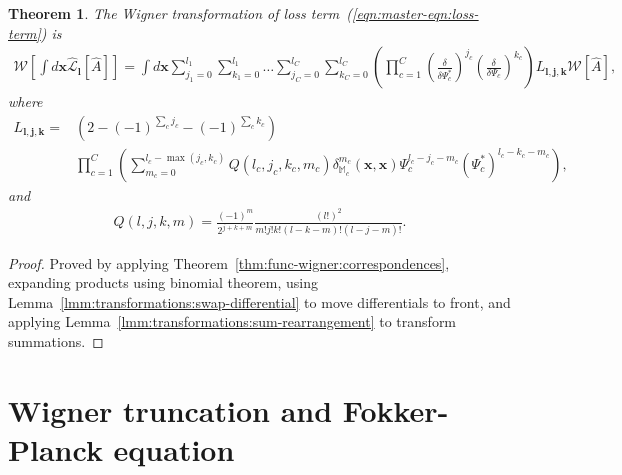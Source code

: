 \documentclass[12pt,aip,jmp,amssymb,amsmath]{revtex4-1}
\newtheorem{theorem}{Theorem}
\begin{document}
\begin{theorem}
\label{thm:transformations:w-losses}
    The Wigner transformation of loss term~(\ref{eqn:master-eqn:loss-term}) is
    \begin{eqnarray*}
        \mathcal{W} \left[ \int d\boldsymbol{x} \hat{\mathcal{L}}_{\boldsymbol{l}} [\hat{A}] \right]
        = \int d\boldsymbol{x}
            \sum_{j_1=0}^{l_1} \sum_{k_1=0}^{l_1} \ldots
            \sum_{j_C=0}^{l_C} \sum_{k_C=0}^{l_C}
                \left(
                    \prod_{c=1}^C
                        \left( \frac{\delta}{\delta \Psi_c^*} \right)^{j_c}
                        \left( \frac{\delta}{\delta \Psi_c} \right)^{k_c}
                \right)
                L_{\boldsymbol{l}, \boldsymbol{j}, \boldsymbol{k}}
            \mathcal{W}[\hat{A}],
    \end{eqnarray*}
    where
    \begin{eqnarray*}
        L_{\boldsymbol{l}, \boldsymbol{j}, \boldsymbol{k}}
        ={} & \left( 2 - (-1)^{\sum_c j_c} - (-1)^{\sum_c k_c} \right) \\
        &   \prod_{c=1}^C \left(
                \sum_{m_c=0}^{l_c - \max(j_c, k_c)}
                Q(l_c, j_c, k_c, m_c)
                \delta_{\mathbb{M}_c}^{m_c}(\boldsymbol{x}, \boldsymbol{x})
                \Psi_c^{l_c - j_c - m_c}
                (\Psi_c^*)^{l_c - k_c - m_c}
            \right),
    \end{eqnarray*}
    and
    \begin{eqnarray*}
        Q(l, j, k, m)
        = \frac{(-1)^m}{2^{j + k + m}}
            \frac{(l!)^2}{m! j! k! (l - k - m)! (l - j - m)!}.
    \end{eqnarray*}
\end{theorem}
\begin{proof}
Proved by applying Theorem~\ref{thm:func-wigner:correspondences}, expanding products using binomial theorem, using Lemma~\ref{lmm:transformations:swap-differential} to move differentials to front, and applying Lemma~\ref{lmm:transformations:sum-rearrangement} to transform summations.
\end{proof}



\section{Wigner truncation and Fokker-Planck equation}
\end{document}
